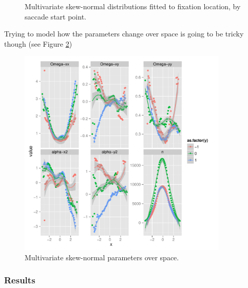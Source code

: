 \documentclass[a4paper, onecolumn, oneside, 11pt]{article}
\begin{document}
\begin{figure}
\caption{Multivariate skew-normal distributions fitted to fixation location, by saccade start point.}
\label{fig:exampleSkewNormal}
\end{figure}

Trying to model how the parameters change over space is going to be tricky though (see Figure \ref{fig:smParamsOverSpace})

\begin{figure}
\includegraphics[width=10cm]{../scripts/flow/paramsChagingOverSpace.pdf}
\caption{Multivariate skew-normal parameters over space.}
\label{fig:smParamsOverSpace}
\end{figure}

\subsubsection{Results}
\end{document}

